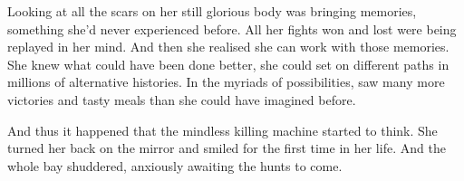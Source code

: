 Looking at all the scars on her still glorious body was bringing memories, something she'd never experienced before. All her fights won and lost were being replayed in her mind. And then she realised she can work with those memories. She knew what could have been done better, she could set on different paths in millions of alternative histories. In the myriads of possibilities, \sharknameformal saw many more victories and tasty meals than she could have imagined before. 

And thus it happened that the mindless killing machine started to think. She turned her back on the mirror and smiled for the first time in her life. And the whole bay shuddered, anxiously awaiting the hunts to come.


